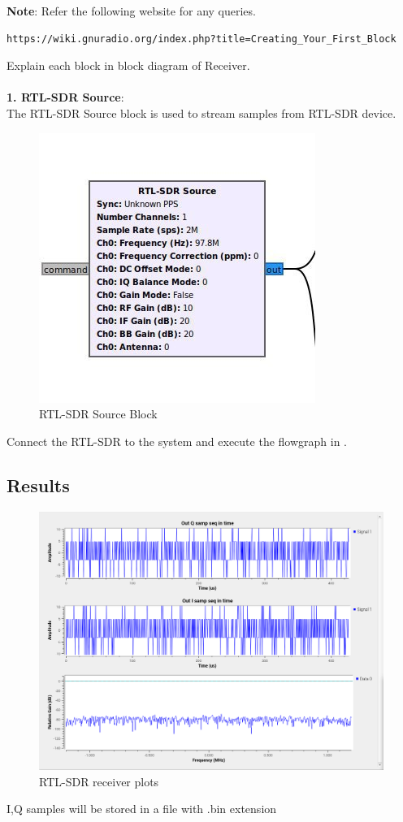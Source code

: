 \textbf{Note}:
Refer the following website for any queries.
\begin{lstlisting}
https://wiki.gnuradio.org/index.php?title=Creating_Your_First_Block
\end{lstlisting}
 Explain each block in block diagram of Receiver.\\
	\solution \\
\textbf{1. RTL-SDR Source}:\\
The RTL-SDR Source block is used to stream samples from RTL-SDR device.
\begin{figure}[ht]
\centering
\includegraphics[width=0.4\columnwidth]{figs/source_block.png}
\caption{RTL-SDR Source Block}
\label{fig:source block_RTL}
\end{figure}
Connect the RTL-SDR to the system and execute the flowgraph in .\\



\subsection{Results} 
\begin{figure}
\includegraphics[width=0.8\columnwidth]{figs/RTL_sdr_res.png}
\caption{RTL-SDR receiver plots}
\end{figure}
I,Q samples will be stored in a file with .bin extension

